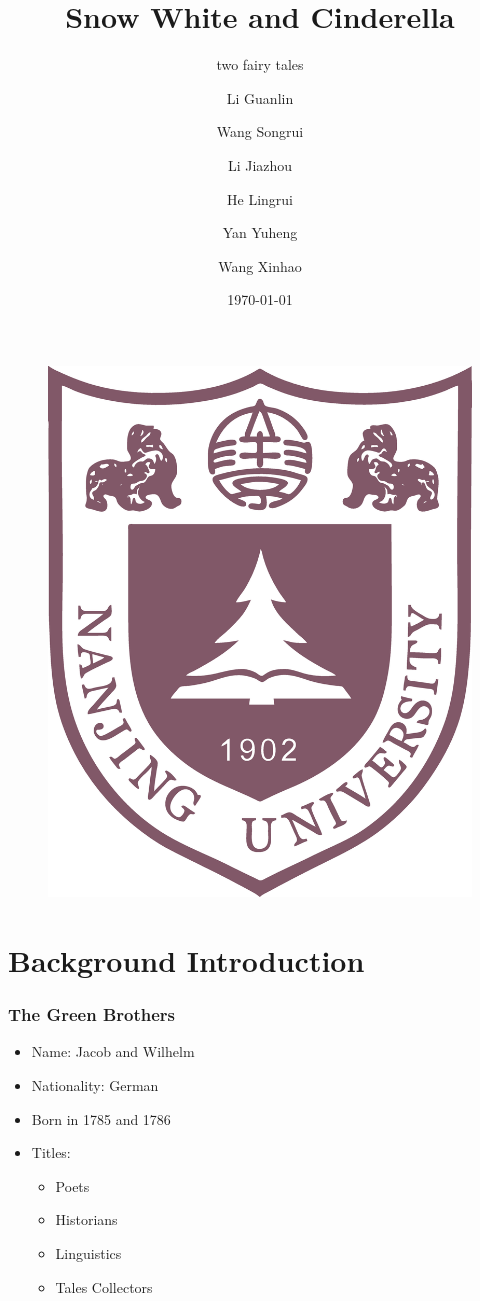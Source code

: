 \documentclass{beamer}
\title[Reflection on Snow White and Cinderella]
{Snow White and Cinderella}
\subtitle{two fairy tales}
\author[Eric, Richard] %
{Li Guanlin\inst{1} \and Wang Songrui\inst{1} \and Li Jiazhou\inst{1} \and He Lingrui\inst{1} \and Yan Yuheng\inst{1} \and Wang Xinhao\inst{1}}
\institute[NJU] %
{
    \inst{1}%
    Undeegraduate in ICS\\
    Nanjing University
}
\date[NJU 2023] %
{\today}
\begin{document}
\begin{frame}
    \titlepage
    \begin{figure}[htpb]
        \begin{center}
            \includegraphics[width=0.2\linewidth]{pic/NJU_Logo.eps}
        \end{center}
    \end{figure}
\end{frame}

\begin{frame}
    \tableofcontents[sectionstyle=show,subsectionstyle=show/shaded/hide,subsubsectionstyle=show/shaded/hide]
\end{frame}

\section{Background Introduction}
\begin{frame}
    \frametitle{The Green Brothers}
    \begin{itemize}
        \item<1-> Name: Jacob and Wilhelm
        \item<2-> Nationality: German
        \item<3-> Born in 1785 and 1786 \cite[baidu]{baidubaike}
        \item<4-> Titles:
            \begin{itemize}
                \item Poets
                \item Historians
                \item Linguistics
                \item \alert{Tales Collectors}
            \end{itemize}
    \end{itemize}
\end{frame}
\end{document}
